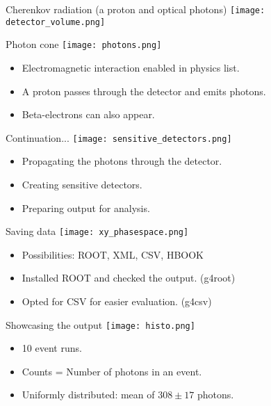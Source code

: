 \documentclass[11pt]{beamer}
\begin{document}
\begin{frame}{Cherenkov radiation (a proton and optical photons)}
    \centering
    \texttt{[image: detector\_volume.png]}
\end{frame}

\begin{frame}{Photon cone}
    \centering
    \texttt{[image: photons.png]}
    \begin{itemize}
        \item<tri@1-> Electromagnetic interaction enabled in physics list.
        \item<tri@1-> A proton passes through the detector and emits photons.
        \item<tri@1-> Beta-electrons can also appear.
    \end{itemize}
\end{frame}

\begin{frame}{Continuation...}
    \centering
    \texttt{[image: sensitive\_detectors.png]}
    \begin{itemize}
        \item<tri@1-> Propagating the photons through the detector.
        \vspace{0.2 cm}
        \item<tri@1-> Creating sensitive detectors.
        \vspace{0.2 cm}
        \item<tri@1-> Preparing output for analysis.
        \vspace{0.2 cm}
    \end{itemize}
\end{frame}


\begin{frame}{Saving data}
    \centering
    \texttt{[image: xy\_phasespace.png]}
    \begin{itemize}
        \item<tri@1-> Possibilities: ROOT, XML, CSV, HBOOK
        \vspace{0.2 cm}
        \item<tri@1-> Installed ROOT and checked the output. (g4root)
        \vspace{0.2 cm}
        \item<tri@1-> Opted for CSV for easier evaluation. (g4csv)
    \end{itemize}
\end{frame}

\begin{frame}{Showcasing the output}
    \centering
    \texttt{[image: histo.png]}
        \begin{itemize}
        \item<tri@1-> 10 event runs.
        \vspace{0.2 cm}
        \item<tri@1-> Counts = Number of photons in an event.
        \vspace{0.2 cm}
        \item<tri@1-> Uniformly distributed: mean of $308\pm17$ photons.
    \end{itemize}
\end{frame}
\end{document}
